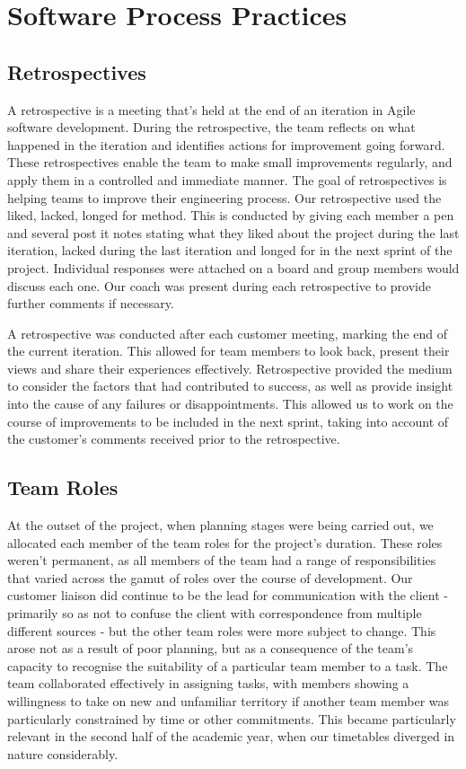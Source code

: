\documentclass{l3proj}
\begin{document}
\section{Software Process Practices}
\label{sec:software process practices}
\subsection{Retrospectives}
\label{subsec: retrospectives}
A retrospective is a meeting that's held at the end of an iteration in Agile software development. During the retrospective, the team reflects on what happened in the iteration and identifies actions for improvement going forward. These retrospectives enable the team to make small improvements regularly, and apply them in a controlled and immediate manner. The goal of retrospectives is helping teams to improve their engineering process. Our retrospective used the liked, lacked, longed for method. This is conducted by giving each member a pen and several post it notes stating what they liked about the project during the last iteration, lacked during the last iteration and longed for in the next sprint of the project. Individual responses were attached on a board and group members would discuss each one. Our coach was present during each retrospective to provide further comments if necessary. \par
A retrospective was conducted after each customer meeting, marking the end of the current iteration. This allowed for team members to look back, present their views and share their experiences effectively. Retrospective provided the medium to consider the factors that had contributed to success, as well as provide insight into the cause of any failures or disappointments. This allowed us to work on the course of improvements to be included in the next sprint, taking into account of the customer's comments received prior to the retrospective. \par
\subsection{Team Roles}
\label{subsec:team roles}
At the outset of the project, when planning stages were being carried out, we allocated each member of the team roles for the project's duration. These roles weren't permanent, as all members of the team had a range of responsibilities that varied across the gamut of roles over the course of development. Our customer liaison did continue to be the lead for communication with the client - primarily so as not to confuse the client with correspondence from multiple different sources - but the other team roles were more subject to change. This arose not as a result of poor planning, but as a consequence of the team's capacity to recognise the suitability of a particular team member to a task. The team collaborated effectively in assigning tasks, with members showing a willingness to take on new and unfamiliar territory if another team member was particularly constrained by time or other commitments. This became particularly relevant in the second half of the academic year, when our timetables diverged in nature considerably.\par
\end{document}
